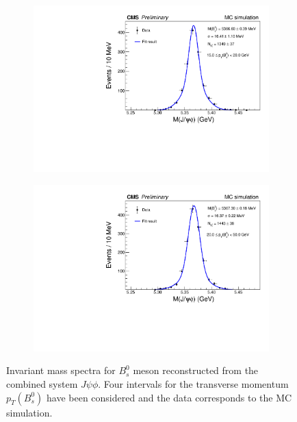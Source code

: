 \begin{figure}
\begin{subfigure}[b]{0.475\textwidth}
		\includegraphics[width=\textwidth]{MainContent/Figs/mass/mass_BsFitMC_best1_ptbins_15_20.PDF}
		\caption{}
	\end{subfigure}
	\hfill
	\begin{subfigure}[b]{0.475\textwidth}
		\centering
		\includegraphics[width=\textwidth]{MainContent/Figs/mass/mass_BsFitMC_best1_ptbins_20_50.PDF}
		\caption{}%
	\end{subfigure}
	\caption{Invariant mass spectra for $B^0_s$ meson reconstructed from the combined system $J\psi\phi$. Four intervals for the transverse momentum $p_T(B^0_s)$ have been considered and the data corresponds to the MC simulation.}
	\label{fig:massMC_ptbins}
\end{figure}



